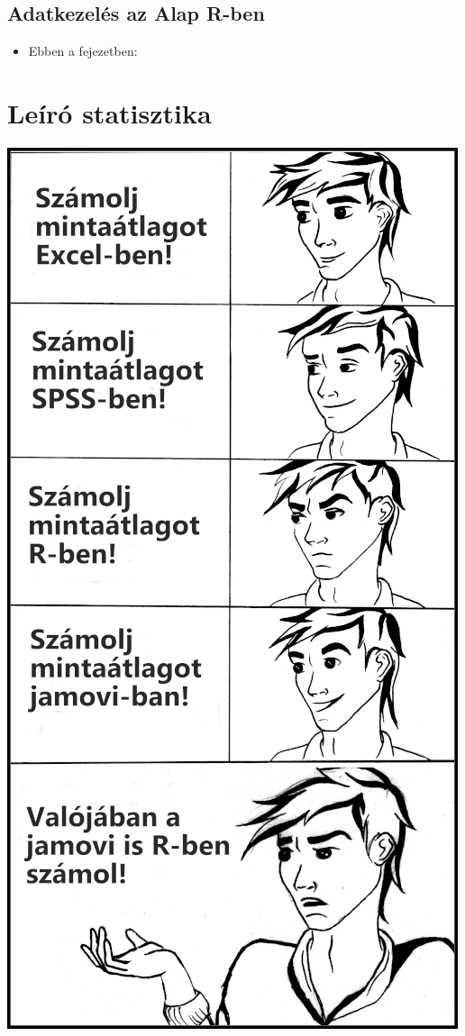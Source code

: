 \documentclass[
]{book}
\newenvironment{rmdblock}[1]
  {\begin{shaded*}
  \begin{itemize}
  \renewcommand{\labelitemi}{
    \raisebox{-.7\height}[0pt][0pt]{
      {\setkeys{Gin}{width=3em,keepaspectratio}\texttt{[image: images/\#1]}}
    }
  }
  \item
  }
  {
  \end{itemize}
  \end{shaded*}
  }
\newenvironment{rmdlevel1}
  {\begin{rmdblock}{level1}}
  {\end{rmdblock}}
\begin{document}
\hypertarget{adatkezeluxe9s-az-alap-r-ben}{%
\section{Adatkezelés az Alap R-ben}\label{adatkezeluxe9s-az-alap-r-ben}}

\begin{rmdlevel1}
Ebben a fejezetben:
\end{rmdlevel1}

\hypertarget{leiro-statisztika}{%
\chapter{Leíró statisztika}\label{leiro-statisztika}}

\begin{center}\includegraphics[width=0.7\linewidth]{images/ch_08_small} \end{center}
\end{document}
